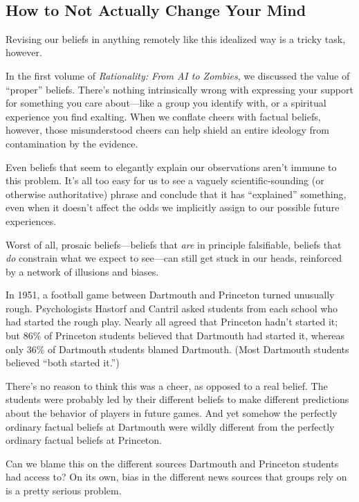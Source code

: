 {
 ~}

\subsection{How to Not Actually Change Your Mind}

{
 Revising our beliefs in anything remotely like this idealized way
is a tricky task, however.}

{
 In the first volume of \textit{Rationality: From AI to Zombies},
we discussed the value of ``proper''
beliefs. There's nothing intrinsically wrong with
expressing your support for something you care about---like a group you
identify with, or a spiritual experience you find exalting. When we
conflate cheers with factual beliefs, however, those misunderstood
cheers can help shield an entire ideology from contamination by the
evidence.}

{
 Even beliefs that seem to elegantly explain our observations
aren't immune to this problem. It's all
too easy for us to see a vaguely scientific-sounding (or otherwise
authoritative) phrase and conclude that it has
``explained'' something, even when
it doesn't affect the odds we implicitly assign to our
possible future experiences.}

{
 Worst of all, prosaic beliefs---beliefs that \textit{are} in
principle falsifiable, beliefs that \textit{do} constrain what we
expect to see---can still get stuck in our heads, reinforced by a
network of illusions and biases.}

{
 In 1951, a football game between Dartmouth and Princeton turned
unusually rough. Psychologists Hastorf and Cantril asked students from
each school who had started the rough play. Nearly all agreed that
Princeton hadn't started it; but 86\% of Princeton
students believed that Dartmouth had started it, whereas only 36\% of
Dartmouth students blamed Dartmouth. (Most Dartmouth students believed
``both started it.'')}

{
 There's no reason to think this was a cheer, as
opposed to a real belief. The students were probably led by their
different beliefs to make different predictions about the behavior of
players in future games. And yet somehow the perfectly ordinary factual
beliefs at Dartmouth were wildly different from the perfectly ordinary
factual beliefs at Princeton.}

{
 Can we blame this on the different sources Dartmouth and Princeton
students had access to? On its own, bias in the different news sources
that groups rely on is a pretty serious problem.}

